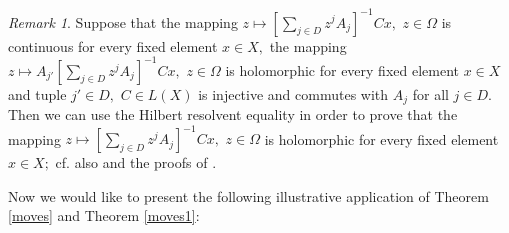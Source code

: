\documentclass{amsart}
\theoremstyle{definition}
\theoremstyle{remark}
\newtheorem{rem}[thm]{Remark}
\numberwithin{equation}{section}
\begin{document}
\begin{rem}\label{pokazna}
Suppose that the mapping $z\mapsto [\sum_{j\in D}z^{j}A_{j}]^{-1}Cx,$ $z\in \Omega$ is continuous for every fixed element $x\in X,$ the mapping $z\mapsto A_{j'}[\sum_{j\in D}z^{j}A_{j}]^{-1}Cx,$ $z\in \Omega$ is holomorphic for every fixed element $x\in X$ and tuple $j'\in D,$ $C\in L(X)$ is injective and commutes with $A_{j}$ for all $j\in D.$ Then we can use the Hilbert resolvent equality in order to prove that
the mapping $z\mapsto [\sum_{j\in D}z^{j}A_{j}]^{-1}Cx,$ $z\in \Omega$ is holomorphic for every fixed element $x\in X;$ cf. also \cite[Lemma 2.6.3]{FKP} and the proofs of \cite[Theorem 1--Theorem 2]{fcaa2025}.
\end{rem}

Now we would like to present the following illustrative application of Theorem \ref{moves} and Theorem \ref{moves1}:
\end{document}
